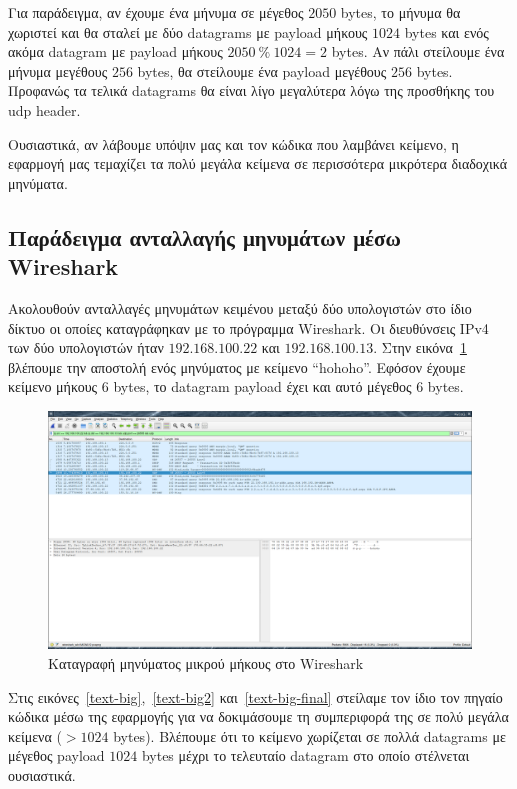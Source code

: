 \documentclass{article}
\begin{document}
Για παράδειγμα, αν έχουμε ένα μήνυμα σε μέγεθος $2050$ bytes, το 
μήνυμα θα χωριστεί και θα σταλεί με δύο datagrams με payload μήκους $1024$ bytes
και ενός ακόμα datagram με payload μήκους $2050\ \%\ 1024 = 2$ bytes. Αν πάλι στείλουμε
ένα μήνυμα μεγέθους $256$ bytes, θα στείλουμε ένα payload μεγέθους $256$ bytes. Προφανώς
τα τελικά datagrams θα είναι λίγο μεγαλύτερα λόγω της προσθήκης του udp header.

Ουσιαστικά, αν λάβουμε υπόψιν μας και τον κώδικα που λαμβάνει κείμενο, η εφαρμογή μας 
τεμαχίζει τα πολύ μεγάλα κείμενα σε περισσότερα μικρότερα διαδοχικά μηνύματα.

\subsection{Παράδειγμα ανταλλαγής μηνυμάτων μέσω Wireshark}
Ακολουθούν ανταλλαγές μηνυμάτων κειμένου μεταξύ δύο υπολογιστών στο ίδιο δίκτυο 
οι οποίες καταγράφηκαν με το πρόγραμμα Wireshark. Οι διευθύνσεις IPv4 των δύο υπολογιστών
ήταν $192.168.100.22$ και $192.168.100.13$. Στην εικόνα~\ref{text-simple-n-small} βλέπουμε 
την αποστολή ενός μηνύματος με κείμενο ``hohoho''. Εφόσον έχουμε κείμενο μήκους $6$ bytes,
το datagram payload έχει και αυτό μέγεθος $6$ bytes.

\begin{figure}
    \centering
    \includegraphics[scale=0.2]{text-simple-small.png}
    \caption{Καταγραφή μηνύματος μικρού μήκους στο Wireshark}\label{text-simple-n-small}
\end{figure}

Στις εικόνες~\ref{text-big},~\ref{text-big2} και~\ref{text-big-final} στείλαμε τον ίδιο 
τον πηγαίο κώδικα μέσω της εφαρμογής για να 
δοκιμάσουμε τη συμπεριφορά της σε πολύ μεγάλα κείμενα ($> 1024$ bytes). Βλέπουμε ότι το 
κείμενο χωρίζεται σε πολλά datagrams με μέγεθος payload $1024$ bytes μέχρι το τελευταίο
datagram στο οποίο στέλνεται ουσιαστικά.
\end{document}
